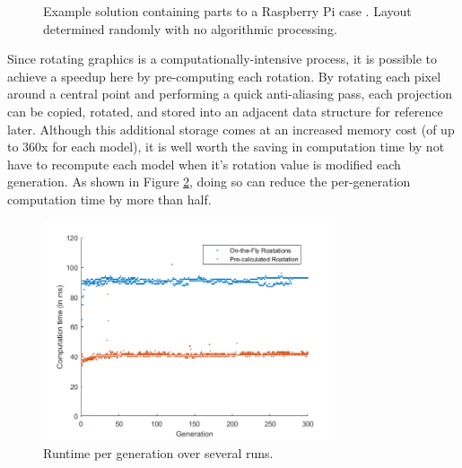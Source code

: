 \documentclass[conference]{IEEEtran}
\begin{document}
\begin{figure}[ht]
\centering
{}
\caption{Example solution containing parts to a Raspberry Pi case \cite{model_rasbpi}. Layout determined randomly with no algorithmic processing.}
\label{fig:rasbpi_random}
\end{figure}

Since rotating graphics is a computationally-intensive process, it is possible to achieve a speedup here by pre-computing each rotation. By rotating each pixel around a central point and performing a quick anti-aliasing pass, each projection can be copied, rotated, and stored into an adjacent data structure for reference later. Although this additional storage comes at an increased memory cost (of up to 360x for each model), it is well worth the saving in computation time by not have to recompute each model when it’s rotation value is modified each generation. As shown in Figure \ref{fig:runtime_plot}, doing so can reduce the per-generation computation time by more than half.

\begin{figure}[ht]
\centering
\includegraphics[width=3.4in]{runtime_plot.png}
\caption{Runtime per generation over several runs.}
\label{fig:runtime_plot}
\end{figure}
\end{document}
